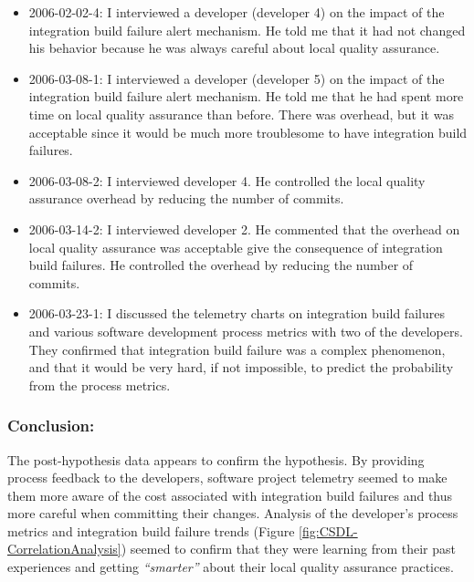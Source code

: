 \begin{itemize}
  \item 2006-02-02-4: I interviewed a developer (developer 4) on the impact of the integration build failure alert mechanism. He told me that it had not changed his behavior because he was always careful about local quality assurance. %
  
  \item 2006-03-08-1: I interviewed a developer (developer 5) on the impact of the integration build failure alert mechanism. He told me that he had spent more time on local quality assurance than before. There was overhead, but it was acceptable since it would be much more troublesome to have integration build failures. %
  
  \item 2006-03-08-2: I interviewed developer 4. He controlled the local quality assurance overhead by reducing the number of commits. %
  
  \item 2006-03-14-2: I interviewed developer 2. He commented that the overhead on local quality assurance was acceptable give the consequence of integration build failures. He controlled the overhead by reducing the number of commits. %
  
  
  \item 2006-03-23-1: I discussed the telemetry charts on integration build failures and various software development process metrics with two of the developers. They confirmed that integration build failure was a complex phenomenon, and that it would be very hard, if not impossible, to predict the probability from the process metrics. 
  
\end{itemize}

\subsubsection{Conclusion:}

The post-hypothesis data appears to confirm the hypothesis. By providing process feedback to the developers, software project telemetry seemed to make them more aware of the cost associated with integration build failures and thus more careful when committing their changes.
Analysis of the developer's process metrics and integration build failure trends (Figure \ref{fig:CSDL-CorrelationAnalysis}) seemed to confirm that they were learning from their past experiences and getting \textit{``smarter''} about their local quality assurance practices.

